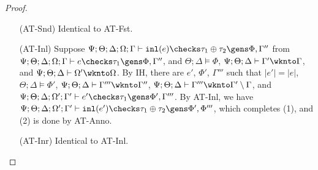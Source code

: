 \begin{proof}
\begin{itemize}
  \item[(AT-Snd)] Identical to AT-Fst.
  
  \item[(AT-Inl)] Suppose $\Psi ; \Theta ; \Delta ; \Omega ; \Gamma \vdash \texttt{inl}(e) \checks \tau_1 \oplus \tau_2 \gens \Phi,\Gamma''$
  from $\Psi ; \Theta ; \Delta ; \Omega ; \Gamma \vdash e \checks \tau_1 \gens \Phi,\Gamma''$, and
  $\Theta ; \Delta \vDash \Phi$,
  $\Psi ; \Theta ; \Delta \vdash \Gamma' \wknto \Gamma$, and
  $\Psi ; \Theta ; \Delta \vdash \Omega' \wknto \Omega$.
  By IH, there are $e'$, $\Phi'$, $\Gamma'''$ such that
  $|e'| = |e|$,
  $\Theta ; \Delta \vDash \Phi'$,
  $\Psi ; \Theta ; \Delta \vdash \Gamma''' \wknto \Gamma''$,
  $\Psi ; \Theta ; \Delta \vdash \Gamma''' \wknto \Gamma' \setminus \Gamma$, and
  $\Psi ; \Theta ; \Delta ; \Omega' ; \Gamma' \vdash e' \checks \tau_1 \gens \Phi',\Gamma'''$.
  By AT-Inl, we have
  $\Psi ; \Theta ; \Delta ; \Omega' ; \Gamma' \vdash \texttt{inl}(e') \checks \tau_1 \oplus \tau_2 \gens \Phi',\Phi'''$,
  which completes (1), and (2) is done by AT-Anno.
  
  \item[(AT-Inr)] Identical to AT-Inl.
  

\end{itemize}
\end{proof}
